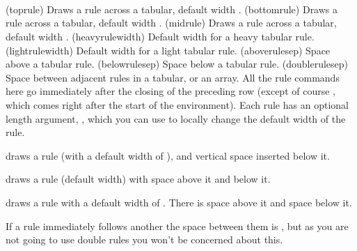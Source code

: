 \begin{syntax}
\cmd{\toprule} 
\cmd{\bottomrule} 
\lnc{\heavyrulewidth} \\
\cmd{\midrule} 
\lnc{\lightrulewidth} \\
\lnc{\aboverulesep} \lnc{\belowrulesep} \lnc{\doublerulesep} \\
\end{syntax}
\glossary(toprule)%
  {}%
  {Draws a rule across a tabular, default width .}
\glossary(bottomrule)%
  {}%
  {Draws a rule across a tabular, default width .}
\glossary(midrule)%
  {}%
  {Draws a rule across a tabular, default width .}
\glossary(heavyrulewidth)%
  {}%
  {Default width for a heavy tabular rule.}
\glossary(lightrulewidth)%
  {}%
  {Default width for a light tabular rule.}
\glossary(aboverulesep)%
  {}%
  {Space above a tabular rule.}
\glossary(belowrulesep)%
  {}%
  {Space below a tabular rule.}
\glossary(doublerulesep)%
  {}%
  {Space between adjacent rules in a tabular, or an array.}
 All the rule commands here go immediately after the closing
\cmd{\\} of the preceding row (except of course \cmd{\toprule}, which
 comes right after the start of the environment). Each rule has an optional
length argument, , which you can use to locally change the default 
width of the rule.

 \cmd{\toprule} draws a rule (with a default width of \lnc{\heavyrulewidth}), 
and \lnc{\belowrulesep} vertical space inserted below it.

   \cmd{\midrule} draws a rule (default \lnc{\lightrulewidth} width) 
with \lnc{\aboverulesep} space above it and \lnc{\belowrulesep}
below it. 


\cmd{\bottomrule} draws a rule with a default width of \lnc{\heavyrulewidth}.
There is \lnc{\aboverulesep} space above it and \lnc{\belowrulesep} space 
below it.

   If a rule immediately follows another the space between them is
\lnc{\doublerulesep}, but as you are not going to use double rules you
won't be concerned about this.

